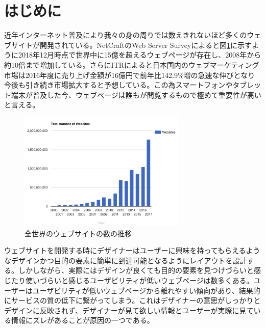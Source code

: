 
\renewcommand{\baselinestretch}{1.5} %
\section{はじめに}\label{sec:introduction}
\renewcommand{\baselinestretch}{1} %

\par 近年インターネット普及により我々の身の周りでは数えきれないほど多くのウェブサイトが開発されている。NetCraftのWeb Server Surveyによると図\ref{fig-num_websites}に示すように2018年12月時点で世界中に15億を超えるウェブページが存在し、2008年から約10倍まで増加している\cite{webserver_survey}。さらにITRによると日本国内のウェブマーケティング市場は2016年度に売り上げ金額が16億円で前年比142.9\%増の急速な伸びとなり今後も引き続き市場拡大すると予想している\cite{itr_webmarket}。この為スマートフォンやタブレット端末が普及した今、ウェブページは誰もが閲覧するもので極めて重要性が高いと言える。

\begin{figure}[H]
    \centering
    \includegraphics[width=8cm]{figures/number-of-websites.png}
    \caption{全世界のウェブサイトの数の推移\cite{internetlivestats}}
    \label{fig-num_websites}
\end{figure}


\par ウェブサイトを開発する時にデザイナーはユーザーに興味を持ってもらえるようなデザインかつ目的の要素に簡単に到達可能となるようにレイアウトを設計する。しかしながら、実際にはデザインが良くても目的の要素を見つけづらいと感じたり使いづらいと感じるユーザビリティが低いウェブページは数多くある。ユーザーはユーザビリティが低いウェブページから離れやすい傾向があり、結果的にサービスの質の低下に繋がってしまう。これはデザイナーの意思がしっかりとデザインに反映されず、デザイナーが見て欲しい情報とユーザーが実際に見ている情報にズレがあることが原因の一つである。


